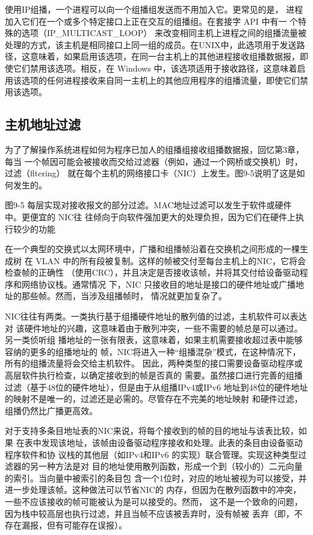 \begin{tcolorbox}
    使用IP组播，一个进程可以向一个组播组发送而不用加入它。更常见的是，
    进程加入它们在一个或多个特定接口上正在交互的组播组。在套接字 API 中有一
    个特殊的选项（IP\_MULTICAST\_LOOP） 来改变相同主机上进程之间的组播流量被
    处理的方式，该主机是相同接口上同一组的成员。在UNIX中，此选项用于发送路
    径，这意味着，如果启用该选项，在同一台主机上的其他进程接收组播数据报，即
    使它们禁用该选项。相反，在 Windows 中，该选项适用于接收路径，这意味着启
    用该选项的任何进程接收来自同一主机上的其他应用程序的组播流量，即使它们禁
    用该选项。
\end{tcolorbox}

\subsection{主机地址过滤}
为了了解操作系统进程如何为程序已加人的组播组接收组播数据报，回忆第3章，每当
一个帧因可能会被接收而交给过滤器（例如，通过一个网桥或交换机）时，过滤（fltering）
就在每个主机的网络接口卡（NIC）上发生。图9-5说明了这是如何发生的。

图9-5 每层实现对接收报文的部分过滤。MAC地址过滤可以发生于软件或硬件中。更便宜的 NIC往
往倾向于向软件强加更大的处理负担，因为它们在硬件上执行较少的功能

在一个典型的交换式以太网环境中，广播和组播帧沿着在交换机之间形成的一棵生成树
在 VLAN 中的所有段被复制。这样的帧被交付至每台主机上的NIC，它将会检查帧的正确性
（使用CRC），并且决定是否接收该帧，并将其交付给设备驱动程序和网络协议栈。通常情况
下，NIC 只接收目的地址是接口的硬件地址或广播地址的那些帧。然而，当涉及组播帧时，
情况就更加复杂了。

NIC往往有两类。一类执行基于组播硬件地址的散列值的过滤，主机软件可以表达对
该硬件地址的兴趣，这意味着由于散列冲突，一些不需要的帧总是可以通过。另一类侦听组
播地址的一张有限表，这意味着，如果主机需要接收超过表中能够容纳的更多的组播地址的
帧，NIC将进入一种“组播混杂”模式，在这种情况下，所有的组播流量将会交给主机软件。
因此，两种类型的接口需要设备驱动程序或高层软件执行检查，以确定接收到的帧是否真的
需要。虽然接口进行完善的组播过滤（基于48位的硬件地址），但是由于从组播IPv4或IPv6
地址到48位的硬件地址的映射不是唯一的，过滤还是必需的。尽管存在不完美的地址映射
和硬件过滤，组播仍然比广播更高效。

对于支持多条目地址表的NIC来说，将每个接收到的帧的目的地址与该表比较，如果
在表中发现该地址，该帧由设备驱动程序接收和处理。此表的条目由设备驱动程序软件和协
议栈的其他层（如IPv4和IPv6 的实现）联合管理。实现这种类型过滤器的另一种方法是对
目的地址使用散列函数，形成一个到（较小的）二元向量的索引。当向量中被索引的条目包
含一个1位时，对应的地址被视为可以接受，并进一步处理该帧。这种做法可以节省NIC的
内存，但因为在散列函数中的冲突，一些不应该接收的帧可能被认为是可以接受的。然而，
这不是一个致命的问题，因为栈中较高层也执行过滤，并且当帧不应该被丢弃时，没有帧被
丢弃（即，不存在漏报，但有可能存在误报）。

